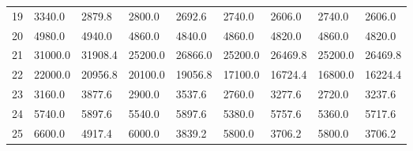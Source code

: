 \begin{tabular}{|r|l|l|l|l|l|l|l|l|}
  19 & 3340.0 & 2879.8 & 2800.0 & 2692.6 & 2740.0 & 2606.0 & 2740.0 & 2606.0 \\ 
  20 & 4980.0 & 4940.0 & 4860.0 & 4840.0 & 4860.0 & 4820.0 & 4860.0 & 4820.0 \\ 
  21 & 31000.0 & 31908.4 & 25200.0 & 26866.0 & 25200.0 & 26469.8 & 25200.0 & 26469.8 \\ 
  22 & 22000.0 & 20956.8 & 20100.0 & 19056.8 & 17100.0 & 16724.4 & 16800.0 & 16224.4 \\ 
  23 & 3160.0 & 3877.6 & 2900.0 & 3537.6 & 2760.0 & 3277.6 & 2720.0 & 3237.6 \\ 
  24 & 5740.0 & 5897.6 & 5540.0 & 5897.6 & 5380.0 & 5757.6 & 5360.0 & 5717.6 \\ 
  25 & 6600.0 & 4917.4 & 6000.0 & 3839.2 & 5800.0 & 3706.2 & 5800.0 & 3706.2 \\ 
\end{tabular}
